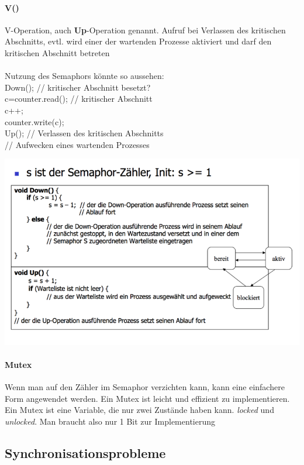\documentclass[10pt,a4paper,landscape]{article}
\newenvironment{allesInCode}{\ttfamily}{\par}
\begin{document}
\begin{multicols*}{3}
	\paragraph{V()} V-Operation, auch \textbf{Up}-Operation genannt. Aufruf bei Verlassen des kritischen Abschnitts, evtl. wird einer der wartenden Prozesse aktiviert und darf den kritischen Abschnitt betreten\\\\
	Nutzung des Semaphors könnte so aussehen:\\
	\begin{allesInCode}
		Down(); // kritischer Abschnitt besetzt? \\
		c=counter.read(); // kritischer Abschnitt \\
		c++; \\
		counter.write(c); \\
		Up(); // Verlassen des kritischen Abschnitts \\
		// Aufwecken eines wartenden Prozesses \\
	\end{allesInCode}
	\includegraphics[width=0.9\columnwidth]{semaphor}
	\paragraph{Mutex} Wenn man auf den Zähler im Semaphor verzichten kann, kann eine einfachere Form angewendet werden. Ein Mutex ist leicht und effizient zu implementieren. Ein Mutex ist eine Variable, die nur zwei Zustände haben kann. \textit{locked} und \textit{unlocked}. Man braucht also nur 1 Bit zur Implementierung
	\subsection{Synchronisationsprobleme}

\end{multicols*}
\end{document}
